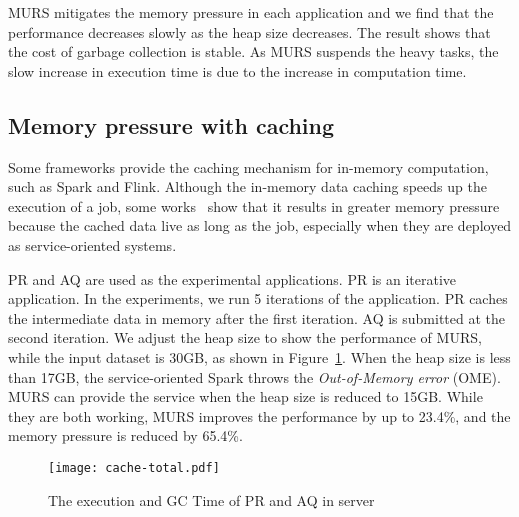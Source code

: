 MURS mitigates the memory pressure in each application and we find that the performance decreases slowly as the heap size decreases. The result shows that the cost of garbage collection is stable. As MURS suspends the heavy tasks, the slow increase in execution time is due to the increase in computation time.  

\begin{comment}
\begin{figure}[!t]
\centering
\texttt{[image: active-task.pdf]}
\caption{The minimum active tasks in each server}
\vspace{-4mm}
\label{fig:active-task}
\end{figure}
\end{comment}

\subsection{Memory pressure with caching}

Some frameworks provide the caching mechanism for in-memory computation, such as Spark and Flink. Although the in-memory data caching speeds up the execution of a job, some works~\cite{bu:bloat, nguyen2015facade} show that it results in greater memory pressure because the cached data live as long as the job, especially when they are deployed as service-oriented systems. 

PR and AQ are used as the experimental applications. PR is an iterative application. In the experiments, we run 5 iterations of the application. PR caches the intermediate data in memory after the first iteration. AQ is submitted at the second iteration. 
We adjust the heap size to show the performance of MURS, while the input dataset is 30GB, as shown in Figure~\ref{fig:cache-total}. When the heap size is less than 17GB, the service-oriented Spark throws the \textit{Out-of-Memory error} (OME). MURS can provide the service when the heap size is reduced to 15GB. While they are both working, MURS improves the performance by up to 23.4\%, and the memory pressure is reduced by 65.4\%.

\begin{figure}[!t]
\centering
\texttt{[image: cache-total.pdf]}
\vspace{-2mm}
\caption{The execution and GC Time of PR and AQ in server}
\vspace{-2mm}
\label{fig:cache-total}
\end{figure}

